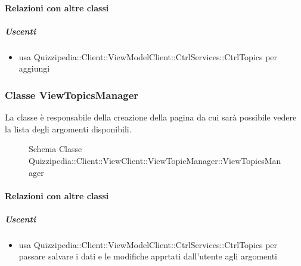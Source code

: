 \paragraph{Relazioni con altre classi}
\subparagraph{Uscenti}
\begin{itemize}
\item usa Quizzipedia::Client::ViewModelClient::CtrlServices::CtrlTopics per aggiungi
\end{itemize}
\subsubsection{Classe ViewTopicsManager}
La classe è responsabile della creazione della pagina da cui sarà possibile vedere la lista degli argomenti disponibili.
\begin{figure}[H]
\centering
\noindent{}
\caption[Schema Classe ViewTopicsManager]{Schema Classe Quizzipedia::Client::ViewClient::ViewTopicManager::ViewTopicsManager}
\end{figure}
\paragraph{Relazioni con altre classi}
\subparagraph{Uscenti}
\begin{itemize}
\item usa Quizzipedia::Client::ViewModelClient::CtrlServices::CtrlTopics per passare salvare i dati e le modifiche apprtati dall'utente agli argomenti
\end{itemize}
